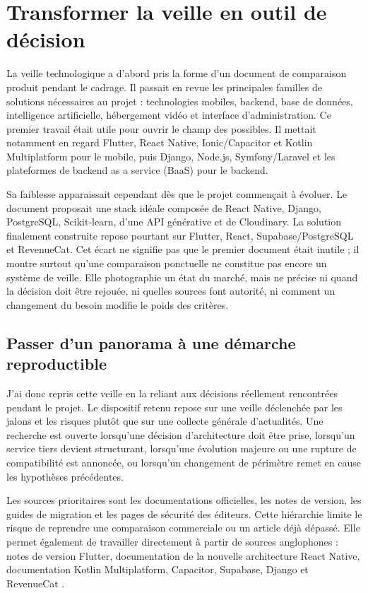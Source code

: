 \section{Transformer la veille en outil de décision}
\label{sec:lynx-veille}

La veille technologique a d'abord pris la forme d'un document de comparaison produit pendant le cadrage. Il passait en revue les principales familles de solutions nécessaires au projet : technologies mobiles, backend, base de données, intelligence artificielle, hébergement vidéo et interface d'administration. Ce premier travail était utile pour ouvrir le champ des possibles. Il mettait notamment en regard Flutter, React Native, Ionic/Capacitor et Kotlin Multiplatform pour le mobile, puis Django, Node.js, Symfony/Laravel et les plateformes de backend as a service (BaaS) pour le backend.

Sa faiblesse apparaissait cependant dès que le projet commençait à évoluer. Le document proposait une \og stack idéale \fg{} composée de React Native, Django, PostgreSQL, Scikit-learn, d'une API générative et de Cloudinary. La solution finalement construite repose pourtant sur Flutter, React, Supabase/PostgreSQL et RevenueCat. Cet écart ne signifie pas que le premier document était inutile ; il montre surtout qu'une comparaison ponctuelle ne constitue pas encore un système de veille. Elle photographie un état du marché, mais ne précise ni quand la décision doit être rejouée, ni quelles sources font autorité, ni comment un changement du besoin modifie le poids des critères.

\subsection{Passer d'un panorama à une démarche reproductible}

J'ai donc repris cette veille en la reliant aux décisions réellement rencontrées pendant le projet. Le dispositif retenu repose sur une veille déclenchée par les jalons et les risques plutôt que sur une collecte générale d'actualités. Une recherche est ouverte lorsqu'une décision d'architecture doit être prise, lorsqu'un service tiers devient structurant, lorsqu'une évolution majeure ou une rupture de compatibilité est annoncée, ou lorsqu'un changement de périmètre remet en cause les hypothèses précédentes.

Les sources prioritaires sont les documentations officielles, les notes de version, les guides de migration et les pages de sécurité des éditeurs. Cette hiérarchie limite le risque de reprendre une comparaison commerciale ou un article déjà dépassé. Elle permet également de travailler directement à partir de sources anglophones : notes de version Flutter, documentation de la nouvelle architecture React Native, documentation Kotlin Multiplatform, Capacitor, Supabase, Django et RevenueCat \cite{flutter-releases,flutter-architecture,react-native-new-architecture,kotlin-multiplatform,capacitor-docs,supabase-rls,supabase-edge-functions,django-admin,revenuecat-webhooks}.

